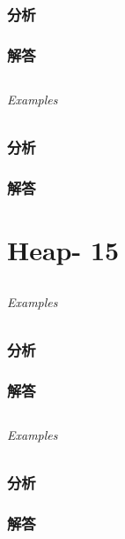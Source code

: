 \documentclass[UTF8,a4paper,12pt]{ctexbook}
\begin{document}
	\subsection{分析}
	
	\subsection{解答}
	
\section{}
	
	\subparagraph{Examples}
	
	\subsection{分析}
	
	\subsection{解答}
\chapter{Heap- 15}
\section{}
	
	\subparagraph{Examples}
	
	\subsection{分析}
	
	\subsection{解答}
	
\section{}
	
	\subparagraph{Examples}
	
	\subsection{分析}
	
	\subsection{解答}
	
\end{document}
